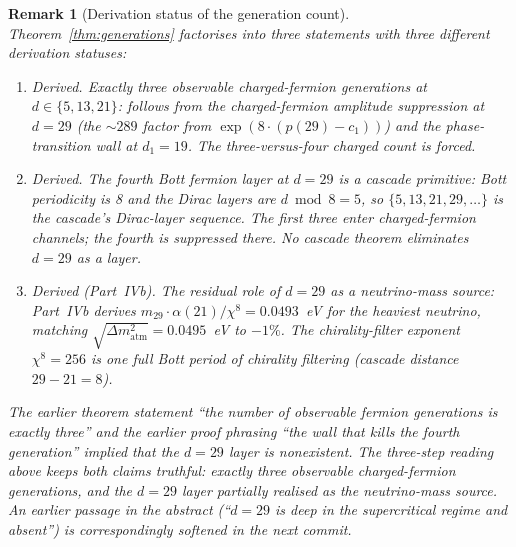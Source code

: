 \documentclass[12pt,a4paper]{article}
\newtheorem{remark}[theorem]{Remark}
\begin{document}
\begin{remark}[Derivation status of the generation count]\label{rem:sp30-status}
Theorem~\ref{thm:generations} factorises into three statements with
three different derivation statuses:
\begin{enumerate}
\item \emph{Derived.} Exactly three observable charged-fermion
generations at $d\in\{5,13,21\}$: follows from the charged-fermion
amplitude suppression at $d=29$ (the $\sim 289$ factor from
$\exp(8\cdot(p(29)-c_1))$) and the phase-transition wall at
$d_1=19$. The three-versus-four \emph{charged} count is forced.
\item \emph{Derived.} The fourth Bott fermion layer at $d=29$ is a
cascade primitive: Bott periodicity is 8 and the Dirac layers are
$d\bmod 8 = 5$, so $\{5,13,21,29,\ldots\}$ is the cascade's
Dirac-layer sequence. The first three enter charged-fermion
channels; the fourth is suppressed there. No cascade theorem
eliminates $d=29$ as a layer.
\item \emph{Derived (Part~IVb).} The residual role of $d=29$ as a
neutrino-mass source: Part~IVb derives
$m_{29}\cdot\alpha(21)/\chi^8 = 0.0493$~eV for the heaviest
neutrino, matching $\sqrt{\Delta m^2_{\mathrm{atm}}} = 0.0495$~eV
to $-1\%$. The chirality-filter exponent $\chi^8 = 256$ is one full
Bott period of chirality filtering (cascade distance $29-21=8$).
\end{enumerate}
The earlier theorem statement ``the number of observable fermion
generations is exactly three'' and the earlier proof phrasing ``the
wall that kills the fourth generation'' implied that the $d=29$
layer is nonexistent. The three-step reading above keeps both
claims truthful: exactly three observable \emph{charged-fermion}
generations, and the $d=29$ layer partially realised as the
neutrino-mass source. An earlier passage in the abstract
(``$d=29$ is deep in the supercritical regime and absent'') is
correspondingly softened in the next commit.
\end{remark}
\end{document}
